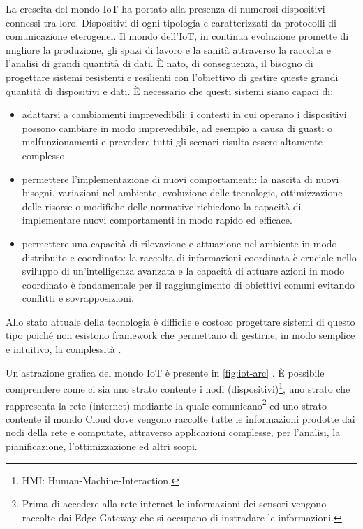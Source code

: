 \documentclass[12pt,a4paper,openright,twoside]{book}
\begin{document}
La crescita del mondo \ac{IoT} ha portato alla presenza di numerosi dispositivi connessi tra loro. Dispositivi di ogni tipologia e caratterizzati da protocolli di comunicazione eterogenei. Il mondo dell'IoT, in continua evoluzione promette di migliore la produzione, gli spazi di lavoro e la sanità attraverso la raccolta e l'analisi di grandi quantità di dati. È nato, di conseguenza, il bisogno di progettare sistemi resistenti e resilienti con l'obiettivo di gestire queste grandi quantità di dispositivi e dati. È necessario che questi sistemi siano capaci di: 
\begin{itemize}
    \item adattarsi a cambiamenti imprevedibili: i contesti in cui operano i dispositivi possono cambiare in modo imprevedibile, ad esempio a causa di guasti o malfunzionamenti e prevedere tutti gli scenari risulta essere altamente complesso. 
    \item permettere l'implementazione di nuovi comportamenti: la nascita di nuovi bisogni, variazioni nel ambiente, evoluzione delle tecnologie, ottimizzazione delle risorse o modifiche delle normative richiedono la capacità di implementare nuovi comportamenti in modo rapido ed efficace. 
    \item permettere una capacità di rilevazione e attuazione nel ambiente in modo distribuito e coordinato: la raccolta di informazioni coordinata è cruciale nello sviluppo di un'intelligenza avanzata e la capacità di attuare azioni in modo coordinato è fondamentale per il raggiungimento di obiettivi comuni evitando conflitti e sovrapposizioni. 
\end{itemize}

Allo stato attuale della tecnologia è difficile e costoso progettare sistemi di questo tipo poiché non esistono framework che permettano di gestirne, in modo semplice e intuitivo, la complessità \cite{Beal2015} \cite{CasadeiPhDThesis}.

Un'astrazione grafica del mondo IoT è presente in \cref{fig:iot-arc} \cite{Testa2022}. È possibile comprendere come ci sia uno strato contente i nodi (dispositivi)\footnote{HMI: Human-Machine-Interaction.}, uno strato che rappresenta la rete (internet) mediante la quale comunicano\footnote{Prima di accedere alla rete internet le informazioni dei sensori vengono raccolte dai Edge Gateway che si occupano di instradare le informazioni.} ed uno strato contente il mondo Cloud dove vengono raccolte tutte le informazioni prodotte dai nodi della rete e computate, attraverso applicazioni complesse, per l'analisi, la pianificazione, l'ottimizzazione ed altri scopi.
\end{document}
